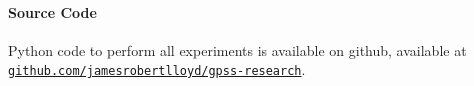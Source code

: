 \documentclass{article} %
\begin{document}
\paragraph{Source Code}
Python code to perform all experiments is available on github, available at 
\href{http://www.github.com/jamesrobertlloyd/gpss-research}
{\texttt{github.com/jamesrobertlloyd/gpss-research}}.








\end{document}

